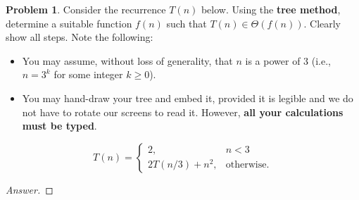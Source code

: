 \documentclass[11pt]{article}
\theoremstyle{definition}
\theoremstyle{definition}
\newtheorem{required}{Problem}
\theoremstyle{definition}
\begin{document}
\begin{required}
Consider the recurrence $T(n)$ below. Using the {\bf tree method}, determine a suitable function $f(n)$ such that $T(n) \in \Theta(f(n))$. Clearly show all steps. Note the following:
\begin{itemize}
\item You may assume, without loss of generality, that $n$ is a power of $3$ (i.e., $n = 3^{k}$ for some integer $k \geq 0$).
\item You may hand-draw your tree and embed it, provided it is legible and we do not have to rotate our screens to read it. However, \textbf{all your calculations must be typed}.
\end{itemize}

\[
T(n) = \begin{cases} 2, &  n < 3 \\ 
2T(n/3) + n^{2}, &  \text{otherwise.} \end{cases}
\]

\end{required}

\begin{proof}[Answer]
\end{proof}
\end{document}
